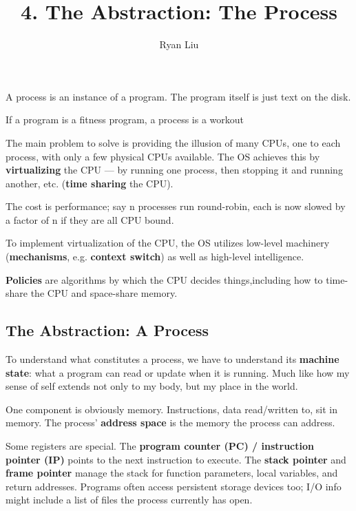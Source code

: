 \documentclass{article}
\title{4. The Abstraction: The Process}
\author{Ryan Liu}
\begin{document}
\maketitle
\thispagestyle{empty}
\newpage
{}

\setcounter{section}{4}
\section*{}

A process is an instance of a program.
The program itself is just text on the disk.

If a program is a fitness program, a process is a workout

The main problem to solve is providing the illusion of many CPUs, one to each process, with only a few physical CPUs available.
The OS achieves this by \textbf{virtualizing} the CPU --- by running one process, then stopping it and running another, etc. (\textbf{time sharing} the CPU).

The cost is performance; say n processes run round-robin, each is now slowed by a factor of n if they are all CPU bound.

To implement virtualization of the CPU, the OS utilizes low-level machinery (\textbf{mechanisms}, e.g. \textbf{context switch}) as well as high-level intelligence.

\textbf{Policies} are algorithms by which the CPU decides things,including how to time-share the CPU and space-share memory.

\subsection{The Abstraction: A Process}

To understand what constitutes a process, we have to understand its \textbf{machine state}: what a program can read or update when it is running.
Much like how my sense of self extends not only to my body, but my place in the world.

One component is obviously memory.
Instructions, data read/written to, sit in memory.
The process' \textbf{address space} is the memory the process can address.

Some registers are special.
The \textbf{program counter (PC) / instruction pointer (IP)} points to the next instruction to execute.
The \textbf{stack pointer} and \textbf{frame pointer} manage the stack for function parameters, local variables, and return addresses.
Programs often access persistent storage devices too; I/O info might include a list of files the process currently has open.
\end{document}
